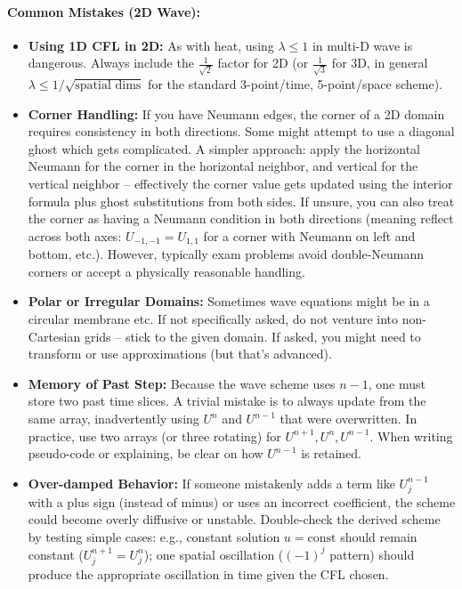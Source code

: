 \documentclass[a4paper,11pt]{article}
\begin{document}
\paragraph{Common Mistakes (2D Wave):}
\begin{itemize}
    \item \textbf{Using 1D CFL in 2D:} As with heat, using $\lambda \le 1$ in multi-D wave is dangerous. Always include the $\frac{1}{\sqrt{2}}$ factor for 2D (or $\frac{1}{\sqrt{3}}$ for 3D, in general $\lambda \le 1/\sqrt{\text{spatial dims}}$ for the standard 3-point/time, 5-point/space scheme).

    \item \textbf{Corner Handling:} If you have Neumann edges, the corner of a 2D domain requires consistency in both directions. Some might attempt to use a diagonal ghost which gets complicated. A simpler approach: apply the horizontal Neumann for the corner in the horizontal neighbor, and vertical for the vertical neighbor -- effectively the corner value gets updated using the interior formula plus ghost substitutions from both sides. If unsure, you can also treat the corner as having a Neumann condition in both directions (meaning reflect across both axes: $U_{-1,-1} = U_{1,1}$ for a corner with Neumann on left and bottom, etc.). However, typically exam problems avoid double-Neumann corners or accept a physically reasonable handling.

    \item \textbf{Polar or Irregular Domains:} Sometimes wave equations might be in a circular membrane etc. If not specifically asked, do not venture into non-Cartesian grids -- stick to the given domain. If asked, you might need to transform or use approximations (but that's advanced).

    \item \textbf{Memory of Past Step:} Because the wave scheme uses $n-1$, one must store two past time slices. A trivial mistake is to always update from the same array, inadvertently using $U^{n}$ and $U^{n-1}$ that were overwritten. In practice, use two arrays (or three rotating) for $U^{n+1},U^n,U^{n-1}$. When writing pseudo-code or explaining, be clear on how $U^{n-1}$ is retained.

    \item \textbf{Over-damped Behavior:} If someone mistakenly adds a term like $U_j^{n-1}$ with a plus sign (instead of minus) or uses an incorrect coefficient, the scheme could become overly diffusive or unstable. Double-check the derived scheme by testing simple cases: e.g., constant solution $u=\text{const}$ should remain constant ($U_j^{n+1}=U_j^n$); one spatial oscillation ($(-1)^j$ pattern) should produce the appropriate oscillation in time given the CFL chosen.
\end{itemize}
\end{document}
